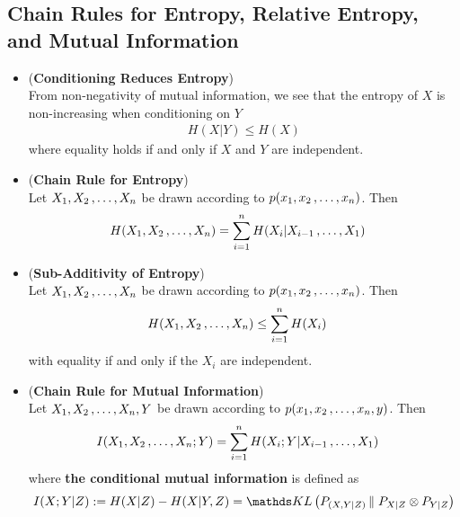 \documentclass[11pt]{article}
\begin{document}
\subsection{Chain Rules for Entropy, Relative Entropy, and Mutual Information}
\begin{itemize}
\item \begin{proposition} (\textbf{Conditioning Reduces Entropy}) \citep{thomas2006elements}\\
From non-negativity of mutual information, we see that the entropy of $X$ is non-increasing when conditioning on $Y$
\begin{align}
H(X | Y) \le  H(X)  \label{ineqn: conditional_entropy}
\end{align} where equality holds if and only if $X$ and $Y$ are independent.
\end{proposition}


\item \begin{proposition} (\textbf{Chain Rule for Entropy}) \citep{thomas2006elements}\\
Let $X_1, X_2 \,{,}\ldots{,}\, X_n$ be drawn according to $p(x_1, x_2 \,{,}\ldots{,}\, x_n)$. Then
\begin{align}
H(X_1, X_2 \,{,}\ldots{,}\, X_n) &= \sum_{i=1}^{n}H(X_i | X_{i-1} \,{,}\ldots{,}\, X_1) \label{eqn: chain_rule_entropy}
\end{align}
\end{proposition}

\item \begin{proposition} (\textbf{Sub-Additivity of Entropy}) \citep{thomas2006elements}\\
Let $X_1, X_2 \,{,}\ldots{,}\, X_n$ be drawn according to $p(x_1, x_2 \,{,}\ldots{,}\, x_n)$. Then
\begin{align}
H(X_1, X_2 \,{,}\ldots{,}\, X_n) &\le \sum_{i=1}^{n}H(X_i)  \label{ineqn: sub_additivity_entropy}
\end{align} with equality if and only if the $X_i$ are independent.
\end{proposition}

\item \begin{proposition} (\textbf{Chain Rule for Mutual Information}) \citep{thomas2006elements}\\
Let $X_1, X_2 \,{,}\ldots{,}\, X_n, Y$ be drawn according to $p(x_1, x_2 \,{,}\ldots{,}\, x_n, y)$. Then
\begin{align}
I(X_1, X_2 \,{,}\ldots{,}\, X_n; Y) &= \sum_{i=1}^{n}H(X_i ; Y | X_{i-1} \,{,}\ldots{,}\, X_1) \label{eqn: chain_rule_mutual_info}
\end{align} where \textbf{the conditional mutual information} is defined as 
\begin{align*}
I(X; Y | Z) := H(X | Z) - H(X | Y, Z) = \kl{P_{(X, Y| Z)}}{P_{X|Z}\otimes P_{Y|Z}} 
\end{align*}
\end{proposition}


\end{itemize}
\end{document}
